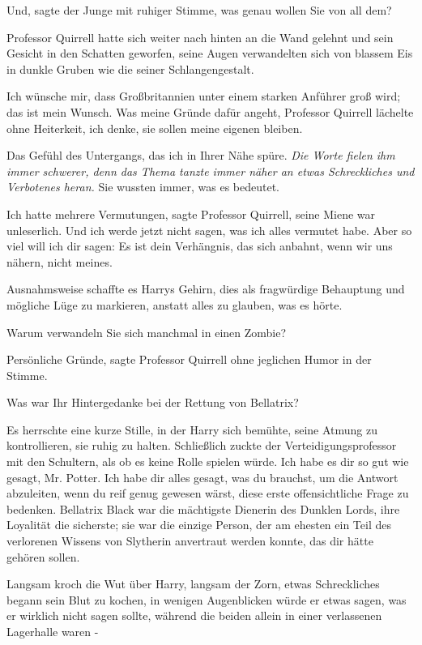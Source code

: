 \glqq{}Und\grqq{}, sagte der Junge mit ruhiger Stimme, \glqq{}was genau wollen Sie
von all dem?\grqq{}

Professor Quirrell hatte sich weiter nach hinten an die Wand gelehnt und sein
Gesicht in den Schatten geworfen, seine Augen verwandelten sich von blassem Eis
in dunkle Gruben wie die seiner Schlangengestalt.

\glqq{}Ich wünsche mir, dass Großbritannien unter einem starken Anführer groß
wird; das ist mein Wunsch. Was meine Gründe dafür angeht\grqq{}, Professor
Quirrell lächelte ohne Heiterkeit, \glqq{}ich denke, sie sollen meine eigenen
bleiben.\grqq{}

\glqq{}Das Gefühl des Untergangs, das ich in Ihrer Nähe spüre.\grqq{} \emph{Die
Worte fielen ihm immer schwerer, denn das Thema tanzte immer näher an etwas
Schreckliches und Verbotenes heran.} \glqq{}Sie wussten immer, was es
bedeutet.\grqq{}

\glqq{}Ich hatte mehrere Vermutungen\grqq{}, sagte Professor Quirrell, seine
Miene war unleserlich. \glqq{}Und ich werde jetzt nicht sagen, was ich alles
vermutet habe. Aber so viel will ich dir sagen: Es ist dein Verhängnis, das sich
anbahnt, wenn wir uns nähern, nicht meines.\grqq{}

Ausnahmsweise schaffte es Harrys Gehirn, dies als fragwürdige Behauptung und
mögliche Lüge zu markieren, anstatt alles zu glauben, was es hörte.

\glqq{}Warum verwandeln Sie sich manchmal in einen Zombie?\grqq{}

\glqq{}Persönliche Gründe\grqq{}, sagte Professor Quirrell ohne jeglichen Humor
in der Stimme.

\glqq{}Was war Ihr Hintergedanke bei der Rettung von Bellatrix?\grqq{}

Es herrschte eine kurze Stille, in der Harry sich bemühte, seine Atmung zu
kontrollieren, sie ruhig zu halten. Schließlich zuckte der
Verteidigungsprofessor mit den Schultern, als ob es keine Rolle spielen würde.
\glqq{}Ich habe es dir so gut wie gesagt, Mr. Potter. Ich habe dir alles gesagt,
was du brauchst, um die Antwort abzuleiten, wenn du reif genug gewesen wärst,
diese erste offensichtliche Frage zu bedenken. Bellatrix Black war die
mächtigste Dienerin des Dunklen Lords, ihre Loyalität die sicherste; sie war die
einzige Person, der am ehesten ein Teil des verlorenen Wissens von Slytherin
anvertraut werden konnte, das dir hätte gehören sollen.\grqq{}

Langsam kroch die Wut über Harry, langsam der Zorn, etwas Schreckliches begann
sein Blut zu kochen, in wenigen Augenblicken würde er etwas sagen, was er
wirklich nicht sagen sollte, während die beiden allein in einer verlassenen
Lagerhalle waren -

